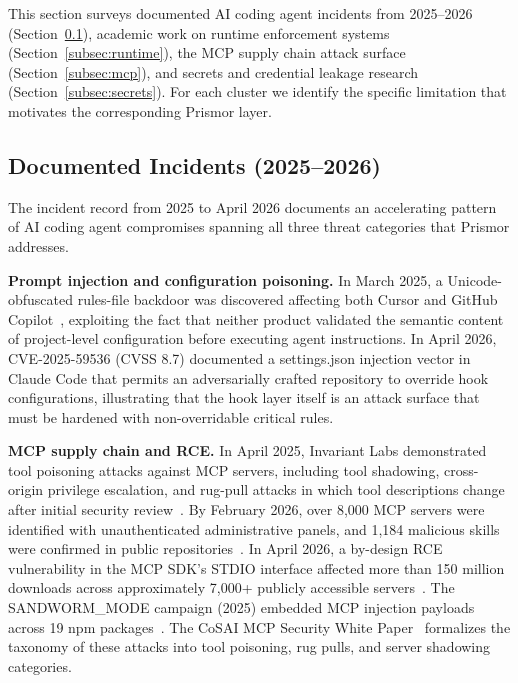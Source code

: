 \documentclass[11pt,letterpaper]{article}
\begin{document}
This section surveys documented AI coding agent incidents from 2025--2026
(Section~\ref{subsec:incidents}), academic work on runtime enforcement
systems (Section~\ref{subsec:runtime}), the MCP supply chain attack surface
(Section~\ref{subsec:mcp}), and secrets and credential leakage research
(Section~\ref{subsec:secrets}).
For each cluster we identify the specific limitation that motivates the
corresponding Prismor layer.

\subsection{Documented Incidents (2025--2026)}
\label{subsec:incidents}

The incident record from 2025 to April 2026 documents an accelerating pattern
of AI coding agent compromises spanning all three threat categories that Prismor
addresses.

\textbf{Prompt injection and configuration poisoning.}
In March 2025, a Unicode-obfuscated rules-file backdoor was discovered affecting
both Cursor and GitHub Copilot~\cite{security2025rules}, exploiting the fact that
neither product validated the semantic content of project-level configuration
before executing agent instructions.
In April 2026, CVE-2025-59536 (CVSS 8.7) documented a settings.json injection
vector in Claude Code that permits an adversarially crafted repository to override
hook configurations, illustrating that the hook layer itself is an attack
surface that must be hardened with non-overridable critical rules.

\textbf{MCP supply chain and RCE.}
In April 2025, Invariant Labs demonstrated tool poisoning attacks against MCP
servers, including tool shadowing, cross-origin privilege escalation, and rug-pull
attacks in which tool descriptions change after initial security
review~\cite{invariantlabs2025mcp,labs2025mcpscan}.
By February 2026, over 8,000 MCP servers were identified with unauthenticated
administrative panels, and 1,184 malicious skills were confirmed in public
repositories~\cite{exposedmcp2026}.
In April 2026, a by-design RCE vulnerability in the MCP SDK's STDIO interface
affected more than 150 million downloads across approximately 7,000+
publicly accessible servers~\cite{mcprce2026}.
The SANDWORM\_MODE campaign (2025) embedded MCP injection payloads across 19
npm packages~\cite{sandworm2025}.
The CoSAI MCP Security White Paper~\cite{cosai2026mcp} formalizes the taxonomy
of these attacks into tool poisoning, rug pulls, and server shadowing categories.
\end{document}
